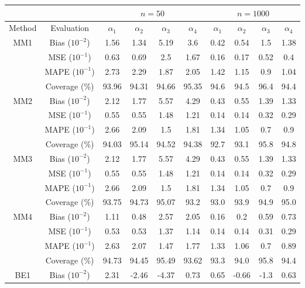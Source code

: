 \begin{table}[htbp]
\centering
\begin{tabular}{c|c|cccc|cccc}
                     &            & \multicolumn{4}{c|}{$n=50$}                       & \multicolumn{4}{c}{$n=1000$}                      \\ \hline
Method               & Evaluation & $\alpha_1$ & $\alpha_2$ & $\alpha_3$ & $\alpha_4$ & $\alpha_1$ & $\alpha_2$ & $\alpha_3$ & $\alpha_4$ \\ \hline
\multirow{4}{*}{MM1}& Bias ($10^{-2}$)  & 1.56 & 1.34 & 5.19 & 3.6 & 0.42 & 0.54 & 1.5 & 1.38 \\ 
& MSE ($10^{-1}$)  & 0.63 & 0.69 & 2.5 & 1.67 & 0.16 & 0.17 & 0.52 & 0.4 \\ 
& MAPE ($10^{-1}$)  & 2.73 & 2.29 & 1.87 & 2.05 & 1.42 & 1.15 & 0.9 & 1.04 \\ 
& Coverage (\%)  & 93.96 & 94.31 & 94.66 & 95.35 & 94.6 & 94.5 & 96.4 & 94.4 \\ 
\hline 
\multirow{4}{*}{MM2}& Bias ($10^{-2}$)  & 2.12 & 1.77 & 5.57 & 4.29 & 0.43 & 0.55 & 1.39 & 1.33 \\ 
& MSE ($10^{-1}$)  & 0.55 & 0.55 & 1.48 & 1.21 & 0.14 & 0.14 & 0.32 & 0.29 \\ 
& MAPE ($10^{-1}$)  & 2.66 & 2.09 & 1.5 & 1.81 & 1.34 & 1.05 & 0.7 & 0.9 \\ 
& Coverage (\%)  & 94.03 & 95.14 & 94.52 & 94.38 & 92.7 & 93.1 & 95.8 & 94.8 \\ 
\hline 
\multirow{4}{*}{MM3}& Bias ($10^{-2}$)  & 2.12 & 1.77 & 5.57 & 4.29 & 0.43 & 0.55 & 1.39 & 1.33 \\ 
& MSE ($10^{-1}$)  & 0.55 & 0.55 & 1.48 & 1.21 & 0.14 & 0.14 & 0.32 & 0.29 \\ 
& MAPE ($10^{-1}$)  & 2.66 & 2.09 & 1.5 & 1.81 & 1.34 & 1.05 & 0.7 & 0.9 \\ 
& Coverage (\%)  & 93.75 & 94.73 & 95.07 & 93.2 & 93.0 & 93.9 & 94.9 & 95.0 \\ 
\hline 
\multirow{4}{*}{MM4}& Bias ($10^{-2}$)  & 1.11 & 0.48 & 2.57 & 2.05 & 0.16 & 0.2 & 0.59 & 0.73 \\ 
& MSE ($10^{-1}$)  & 0.53 & 0.53 & 1.37 & 1.14 & 0.14 & 0.14 & 0.31 & 0.29 \\ 
& MAPE ($10^{-1}$)  & 2.63 & 2.07 & 1.47 & 1.77 & 1.33 & 1.06 & 0.7 & 0.89 \\ 
& Coverage (\%)  & 94.73 & 94.45 & 95.49 & 93.62 & 93.3 & 94.0 & 95.8 & 94.4 \\ 
\hline 
\multirow{4}{*}{BE1}& Bias ($10^{-2}$)  & 2.31 & -2.46 & -4.37 & 0.73 & 0.65 & -0.66 & -1.3 & 0.63 \\ 

\end{tabular}
\end{table}
